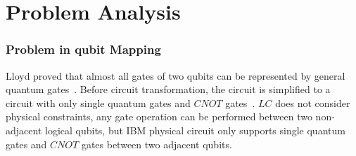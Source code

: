 \documentclass[runningheads]{llncs}
\begin{document}
\section{Problem Analysis}
\label{Problem Analysis}

\subsubsection{Problem in qubit Mapping}
Lloyd proved that almost all gates of two qubits can be represented by general quantum gates~\cite{Lloyd1995Almost}. 
Before circuit transformation, the circuit is simplified to a circuit with only single 
quantum gates and $CNOT$ gates~\cite{2005Mttnen,1995Barenco}.
 $LC$ does not consider physical constraints, 
any gate operation can be performed between two non-adjacent logical qubits, 
but IBM physical circuit only supports single quantum gates and $CNOT$ gates between two adjacent qubits. 
\end{document}
